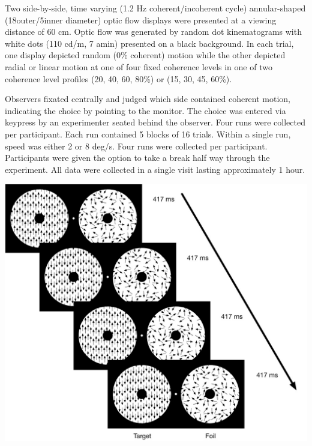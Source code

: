 \documentclass[landscape,final,paperwidth=60in,paperheight=40in,fontscale=0.285]{baposter}
\begin{document}
\begin{poster}
{\begin{center}
\end{center}
\par Two side-by-side, time varying (1.2 Hz coherent/incoherent cycle) annular-shaped (18\degree outer/5\degree inner diameter) optic flow displays were presented at a viewing distance of 60 cm. Optic flow was generated by random dot kinematograms with white dots (110 cd/m, 7 amin) presented on a black background. In each trial, one display depicted random (0\% coherent) motion while the other depicted radial or linear motion at one of four fixed coherence levels in one of two coherence level profiles (20, 40, 60, 80\%) or (15, 30, 45, 60\%).
\par Observers fixated centrally and judged which side contained coherent motion, indicating the choice by pointing to the monitor. The choice was entered via keypress by an experimenter seated behind the observer. Four runs were collected per participant. Each run contained 5 blocks of 16 trials. Within a single run, speed was either 2 or 8 deg/s. Four runs were collected per participant. Participants were given the option to take a break half way through the experiment. All data were collected in a single visit lasting approximately 1 hour.
    }
    {
\begin{center}
\includegraphics[scale=0.25]{img/moco-psychophysics-display.jpg}\\

\end{center}}
\end{poster}
\end{document}
